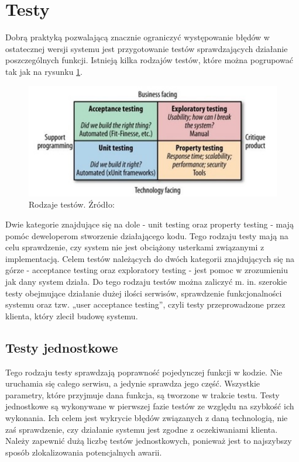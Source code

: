 \documentclass[11pt, a4]{article} %
\begin{document}
\section{Testy}

Dobrą praktyką pozwalającą znacznie ograniczyć występowanie błędów w ostatecznej 
wersji systemu jest przygotowanie testów sprawdzających działanie poszczególnych 
funkcji. Istnieją kilka rodzajów testów, które można pogrupować tak jak na rysunku
\ref{fig:test-types}.

\begin{figure}[h]
    \centering
    \includegraphics[width=1\textwidth]{test_types.jpg}
    \caption{Rodzaje testów. Źródło: \parencite{newman:2015ap}}
    \label{fig:test-types}
\end{figure}

Dwie kategorie znajdujące się na dole - unit testing oraz property testing - mają 
pomóc deweloperom stworzenie działającego kodu. Tego rodzaju testy mają na celu 
sprawdzenie, czy system nie jest obciążony usterkami związanymi z implementacją. 
Celem testów należących do dwóch kategorii znajdujących się na górze - acceptance 
testing oraz exploratory testing - jest pomoc w zrozumieniu jak dany system działa. 
Do tego rodzaju testów można zaliczyć m. in. szerokie testy obejmujące działanie dużej 
ilości serwisów, sprawdzenie funkcjonalności systemu oraz tzw. „user acceptance 
testing”, czyli testy przeprowadzone przez klienta, który zlecił budowę systemu.

\subsection{Testy jednostkowe}

Tego rodzaju testy sprawdzają poprawność pojedynczej funkcji w kodzie. Nie uruchamia 
się całego serwisu, a jedynie sprawdza jego część. Wszystkie parametry, które 
przyjmuje dana funkcja, są tworzone w trakcie testu. Testy jednostkowe są wykonywane 
w pierwszej fazie testów ze względu na szybkość ich wykonania. Ich celem jest wykrycie 
błędów związanych z daną technologią, nie zaś sprawdzenie, czy działanie systemu jest 
zgodne z oczekiwaniami klienta. Należy zapewnić dużą liczbę testów 
jednostkowych, ponieważ jest to najszybszy sposób zlokalizowania potencjalnych awarii.
\end{document}
